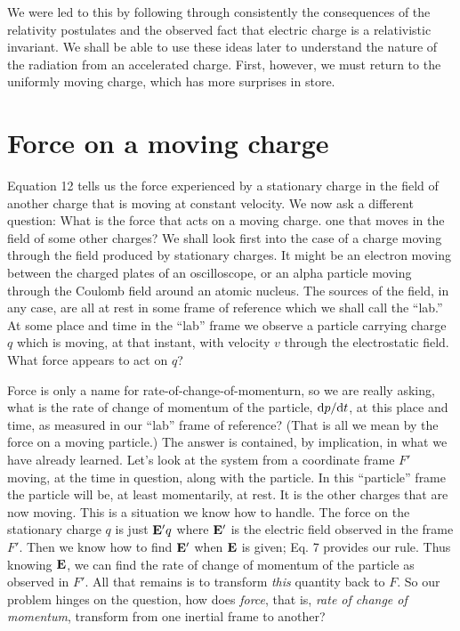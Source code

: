 We were led to this by following through consistently the consequences
of the relativity postulates and the observed fact that electric
charge is a relativistic invariant. We shall be able to use these ideas
later to understand the nature of the radiation from an accelerated
charge. First, however, we must return to the uniformly moving
charge, which has more surprises in store.

\section{Force on a moving charge}

Equation 12 tells us the force experienced by a stationary charge
in the field of another charge that is moving at constant velocity.
We now ask a different question: What is the force that acts on a
moving charge. one that moves in the field of some other charges?
We shall look first into the case of a charge moving through the field
produced by stationary charges. It might be an electron moving
between the charged plates of an oscilloscope, or an alpha particle
moving through the Coulomb field around an atomic nucleus. The
sources of the field, in any case, are all at rest in some frame of reference
which we shall call the ``lab.'' At some place and time in the
``lab'' frame we observe a particle carrying charge $q$ which is moving,
at that instant, with velocity $v$ through the electrostatic field. What
force appears to act on $q$?

Force is only a name for rate-of-change-of-momenturn, so we are
really asking, what is the rate of change of momentum of the particle,
$\textup{d} p/\textup{d} t$, at this place and time, as measured in our ``lab'' frame of reference?
(That is all we mean by the force on a moving particle.)
The answer is contained, by implication, in what we have already
learned. Let's look at the system from a coordinate frame $F'$ moving,
at the time in question, along with the particle. In this ``particle''
frame the particle will be, at least momentarily, at rest. It is the
other charges that are now moving. This is a situation we know
how to handle. The force on the stationary charge $q$ is just $\mathbf{E}'q$ where
$\mathbf{E}'$ is the electric field observed in the frame $F'$. Then we know how
to find $\mathbf{E}'$ when $\mathbf{E}$ is given; Eq. 7 provides our rule. Thus knowing
$\mathbf{E}$, we can find the rate of change of momentum of the particle as
observed in $F'$. All that remains is to transform \emph{this} quantity back
to $F$. So our problem hinges on the question, how does \emph{force}, that
is, \emph{rate of change of momentum}, transform from one inertial frame
to another?

